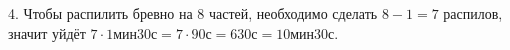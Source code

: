 4. Чтобы распилить бревно на 8 частей, необходимо сделать $8-1=7$ распилов, значит уйдёт $7\cdot1\text{мин}30\text{с}=7\cdot90\text{с}=630\text{с}=10\text{мин}30\text{с}.$\\
